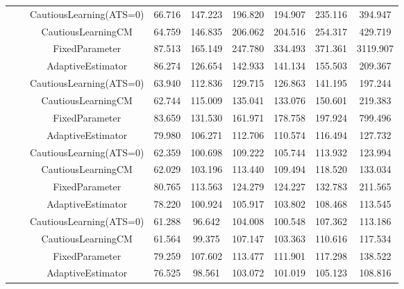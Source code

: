 \begin{table}[!h]
\begin{tabular}[t]{ccccccccc}
 &  & CautiousLearning(ATS=0) & 66.716 & 147.223 & 196.820 & 194.907 & 235.116 & 394.947\\

 &  & CautiousLearningCM & 64.759 & 146.835 & 206.062 & 204.516 & 254.317 & 429.719\\

 & \multirow[t]{-4}{*}{\centering\arraybackslash 0.35} & FixedParameter & 87.513 & 165.149 & 247.780 & 334.493 & 371.361 & 3119.907\\
\cmidrule{2-9}
 &  & AdaptiveEstimator & 86.274 & 126.654 & 142.933 & 141.134 & 155.503 & 209.367\\

 &  & CautiousLearning(ATS=0) & 63.940 & 112.836 & 129.715 & 126.863 & 141.195 & 197.244\\

 &  & CautiousLearningCM & 62.744 & 115.009 & 135.041 & 133.076 & 150.601 & 219.383\\

 & \multirow[t]{-4}{*}{\centering\arraybackslash 0.50} & FixedParameter & 83.659 & 131.530 & 161.971 & 178.758 & 197.924 & 799.496\\
\cmidrule{2-9}
 &  & AdaptiveEstimator & 79.980 & 106.271 & 112.706 & 110.574 & 116.494 & 127.732\\

 &  & CautiousLearning(ATS=0) & 62.359 & 100.698 & 109.222 & 105.744 & 113.932 & 123.994\\

 &  & CautiousLearningCM & 62.029 & 103.196 & 113.440 & 109.494 & 118.520 & 133.034\\

 & \multirow[t]{-4}{*}{\centering\arraybackslash 0.75} & FixedParameter & 80.765 & 113.563 & 124.279 & 124.227 & 132.783 & 211.565\\
\cmidrule{2-9}
 &  & AdaptiveEstimator & 78.220 & 100.924 & 105.917 & 103.802 & 108.468 & 113.545\\

 &  & CautiousLearning(ATS=0) & 61.288 & 96.642 & 104.008 & 100.548 & 107.362 & 113.186\\

 &  & CautiousLearningCM & 61.564 & 99.375 & 107.147 & 103.363 & 110.616 & 117.534\\

 & \multirow[t]{-4}{*}{\centering\arraybackslash 1.00} & FixedParameter & 79.259 & 107.602 & 113.477 & 111.901 & 117.298 & 138.522\\
\cmidrule{2-9}
 &  & AdaptiveEstimator & 76.525 & 98.561 & 103.072 & 101.019 & 105.123 & 108.816\\


\end{tabular}
\end{table}
